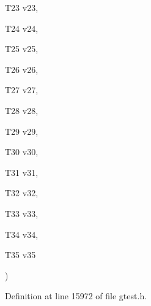 {{\begin{DoxyParamCaption}
\item[{\-T23}]{v23, }
\item[{\-T24}]{v24, }
\item[{\-T25}]{v25, }
\item[{\-T26}]{v26, }
\item[{\-T27}]{v27, }
\item[{\-T28}]{v28, }
\item[{\-T29}]{v29, }
\item[{\-T30}]{v30, }
\item[{\-T31}]{v31, }
\item[{\-T32}]{v32, }
\item[{\-T33}]{v33, }
\item[{\-T34}]{v34, }
\item[{\-T35}]{v35}
\end{DoxyParamCaption}
)}}\label{d0/d75/namespacetesting_a8746425c9d27e46ea5bc5fd77586bc2a}


\-Definition at line 15972 of file gtest.\-h.


